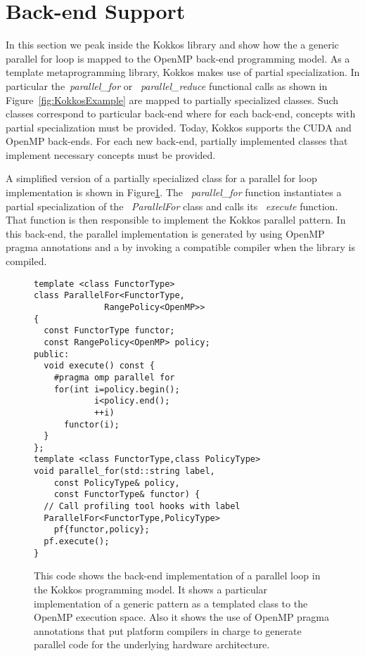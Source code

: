 
\section{Back-end Support}\label{chap:backend}

In this section we peak inside the Kokkos library and show how the a generic parallel for loop is mapped to the OpenMP back-end programming model. As a template metaprogramming library, Kokkos makes use of partial specialization. In particular the~\emph{parallel\_for} or ~\emph{parallel\_reduce} functional calls as shown in Figure~\ref{fig:KokkosExample} are mapped to partially specialized classes. Such classes correspond to particular back-end where for each back-end, concepts with partial specialization must be provided. Today, Kokkos supports the CUDA and OpenMP back-ends. For each new back-end, partially implemented classes that implement necessary concepts must be provided.

A simplified version of a partially specialized class for a parallel for loop implementation is shown in Figure\ref{fig:KokkosExampleOMPBackEnd}. The ~\emph{parallel\_for} function instantiates a partial specialization of the ~\emph{ParallelFor} class and calls its ~\emph{execute} function. That function is then responsible to implement the Kokkos parallel pattern. In this back-end, the parallel implementation is generated by using OpenMP pragma annotations and a by invoking a compatible compiler when the library is compiled. 
\begin{figure}
\begin{small}
\begin{verbatim}
template <class FunctorType>
class ParallelFor<FunctorType,
              RangePolicy<OpenMP>> 
{
  const FunctorType functor;
  const RangePolicy<OpenMP> policy; 
public:
  void execute() const {
    #pragma omp parallel for
    for(int i=policy.begin();
            i<policy.end();
            ++i)
      functor(i);
  }
};
template <class FunctorType,class PolicyType>
void parallel_for(std::string label, 
    const PolicyType& policy,
    const FunctorType& functor) {
  // Call profiling tool hooks with label
  ParallelFor<FunctorType,PolicyType> 
    pf{functor,policy};
  pf.execute();
}
\end{verbatim}
\end{small}
\caption{This code shows the back-end implementation of a parallel loop in the Kokkos programming model. It shows a particular implementation of a generic pattern as a templated class to the OpenMP execution space. Also it shows the use of OpenMP pragma annotations that put platform compilers in charge to generate parallel code for the underlying hardware architecture.}
\label{fig:KokkosExampleOMPBackEnd}
\end{figure}


